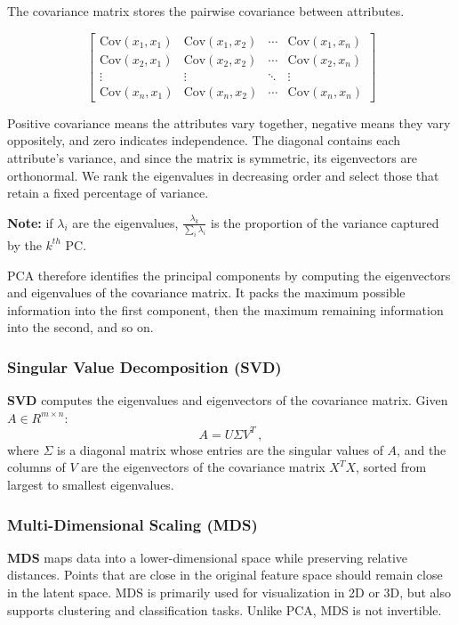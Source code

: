 The covariance matrix stores the pairwise covariance between attributes.

\begin{equation}
\begin{bmatrix}
\mathrm{Cov}(x_1, x_1) & \mathrm{Cov}(x_1, x_2) & \cdots & \mathrm{Cov}(x_1, x_n) \\
\mathrm{Cov}(x_2, x_1) & \mathrm{Cov}(x_2, x_2) & \cdots & \mathrm{Cov}(x_2, x_n) \\
\vdots & \vdots & \ddots & \vdots \\
\mathrm{Cov}(x_n, x_1) & \mathrm{Cov}(x_n, x_2) & \cdots & \mathrm{Cov}(x_n, x_n)
\end{bmatrix}
\end{equation}

Positive covariance means the attributes vary together, negative means they vary oppositely, and zero indicates independence. The diagonal contains each attribute's variance, and since the matrix is symmetric, its eigenvectors are orthonormal. We rank the eigenvalues in decreasing order and select those that retain a fixed percentage of variance.

\textbf{Note:} if $\lambda_i$ are the eigenvalues, $\frac{\lambda_k}{\sum_i \lambda_i}$ is the proportion of the variance captured by the $k^{th}$ PC.

PCA therefore identifies the principal components by computing the eigenvectors and eigenvalues of the covariance matrix. It packs the maximum possible information into the first component, then the maximum remaining information into the second, and so on.

\subsubsection{Singular Value Decomposition (SVD)}
\textbf{SVD} computes the eigenvalues and eigenvectors of the covariance matrix. Given $A \in R^{m \times n}$:
\begin{equation*}
    A = U \Sigma V^T \,,
\end{equation*}
where $\Sigma$ is a diagonal matrix whose entries are the singular values of $A$, and the columns of $V$ are the eigenvectors of the covariance matrix $X^T X$, sorted from largest to smallest eigenvalues.
    
\subsubsection{Multi-Dimensional Scaling (MDS)}
\textbf{MDS} maps data into a lower-dimensional space while preserving relative distances. Points that are close in the original feature space should remain close in the latent space. MDS is primarily used for visualization in 2D or 3D, but also supports clustering and classification tasks. Unlike PCA, MDS is not invertible.

